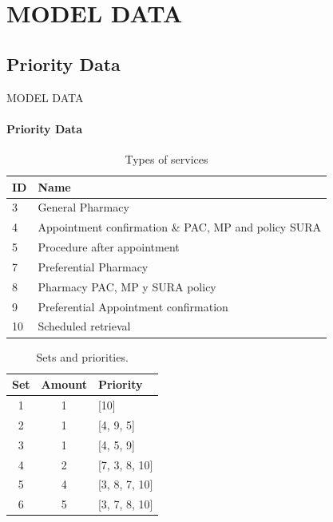 \section{MODEL DATA}
\subsection{Priority Data}
\begin{frame}{MODEL DATA}
\framesubtitle{Priority Data}
\begin{multicols}{2}
    \begin{table}[H]
    \centering
    \begin{tabular}{lp{4cm}}
    \hline
    \textbf{ID} & \textbf{Name}                                       \\ \hline
    3           & General Pharmacy                                    \\
    4           & Appointment confirmation \& PAC, MP and policy SURA \\
    5           & Procedure after appointment                                             \\
    7           & Preferential Pharmacy                               \\
    8           & Pharmacy PAC, MP y SURA policy                      \\
    9           & Preferential Appointment confirmation 
             \\
    10       & Scheduled retrieval    
    \\ \hline
    \end{tabular}
    \caption{Types of services}
    \label{tab:types_serv}
    \end{table}
    \columnbreak
    \begin{table}[H]
\centering
\begin{tabular}{ccl}
\hline
\textbf{Set} & \textbf{Amount} & \textbf{Priority} \\ \hline
1            & 1               & {[}10{]}          \\ 
2            & 1               & {[}4, 9, 5{]}     \\
3            & 1               & {[}4, 5, 9{]}     \\
4            & 2               & {[}7, 3, 8, 10{]} \\
5            & 4               & {[}3, 8, 7, 10{]} \\
6            & 5               & {[}3, 7, 8, 10{]} \\
\hline
\end{tabular}
\caption{Sets and priorities.}
\label{tab:sets_priorities_opt}
\end{table}

\end{multicols}
\end{frame}

